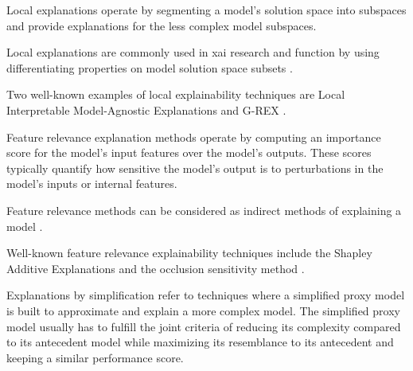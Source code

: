 \begin{definition}
  Local explanations operate by segmenting a model's solution space into
  subspaces and provide explanations for the less complex model subspaces.
\end{definition}

\begin{remark}
  Local explanations are commonly used in \ac{xai} research and function by using
  differentiating properties on model solution space subsets \citep[Page 7,
  Section 2.5.2]{arrieta2020explainable}.
\end{remark}

\begin{remark}
  Two well-known examples of local explainability techniques are Local
  Interpretable Model-Agnostic Explanations \citep{lime} and G-REX
  \citep{konig2008g}.
\end{remark}

\begin{definition}
  Feature relevance explanation methods operate by computing an importance score
  for the model's input features over the model's outputs. These
  scores typically quantify how sensitive the model's output is to perturbations
  in the model's inputs or internal features.
\end{definition}

\begin{remark}
  \label{rmk:feature_relevance_indirect}
  Feature relevance methods can be considered as indirect methods of explaining
  a model \citep[Page 7, Section 2.5.2]{arrieta2020explainable}.
\end{remark}

\begin{remark}
  Well-known feature relevance explainability techniques include the Shapley
  Additive Explanations \citep{lundberg2017unified} and the occlusion
  sensitivity method \citep{zeiler2014visualizing}.
\end{remark}

\begin{definition}
  \label{def:explain_simplify}
  Explanations by simplification refer to techniques where a simplified proxy
  model is built to approximate and explain a more complex model. The simplified
  proxy model usually has to fulfill the joint criteria of reducing its
  complexity compared to its antecedent model while maximizing its resemblance
  to its antecedent and keeping a similar performance score.
\end{definition}

